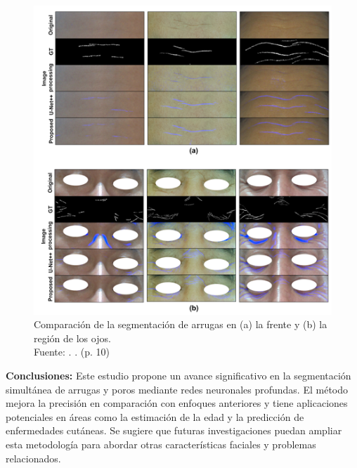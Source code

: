 \begin{figure}[!ht]
	\begin{center}
		\includegraphics[width=1\textwidth]{2/figures/resant1.png}
		\caption[Comparación de la segmentación de arrugas en (a) la frente y (b) la región de los ojos]{Comparación de la segmentación de arrugas en (a) la frente y (b) la región de los ojos.\\
			Fuente: \cite{yoon2023}. . (p. 10)}
		\label{2:fig1}
	\end{center}
\end{figure}

\textbf{Conclusiones:}
Este estudio propone un avance significativo en la segmentación simultánea de arrugas y poros mediante redes neuronales profundas. El método mejora la precisión en comparación con enfoques anteriores y tiene aplicaciones potenciales en áreas como la estimación de la edad y la predicción de enfermedades cutáneas. Se sugiere que futuras investigaciones puedan ampliar esta metodología para abordar otras características faciales y problemas relacionados.

\subsection{}

